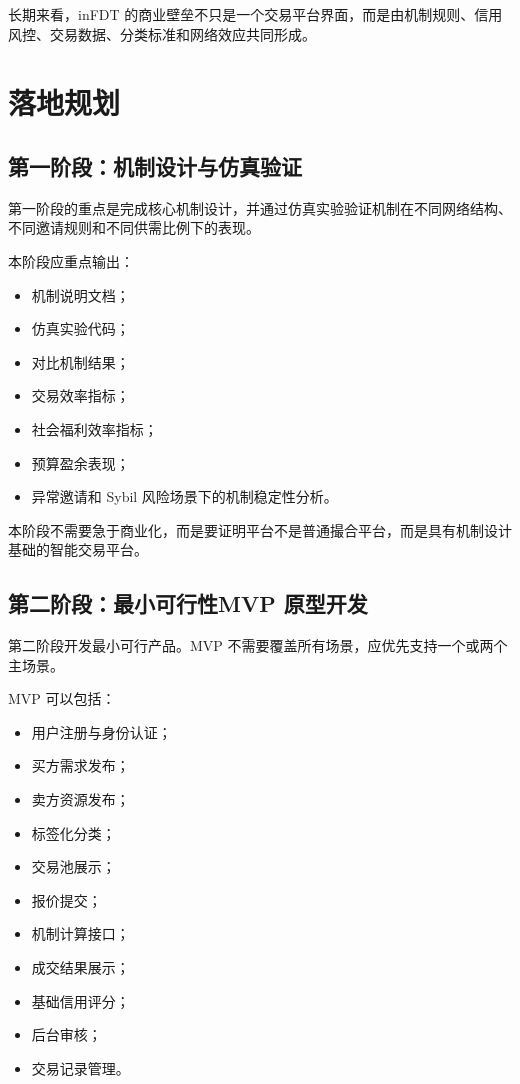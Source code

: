 \documentclass[UTF8,a4paper,12pt]{ctexart}
\begin{document}
长期来看，inFDT 的商业壁垒不只是一个交易平台界面，而是由机制规则、信用风控、交易数据、分类标准和网络效应共同形成。


\newpage
\section{落地规划}

\subsection{第一阶段：机制设计与仿真验证}

第一阶段的重点是完成核心机制设计，并通过仿真实验验证机制在不同网络结构、不同邀请规则和不同供需比例下的表现。

本阶段应重点输出：

\begin{itemize}
    \item 机制说明文档；
    \item 仿真实验代码；
    \item 对比机制结果；
    \item 交易效率指标；
    \item 社会福利效率指标；
    \item 预算盈余表现；
    \item 异常邀请和 Sybil 风险场景下的机制稳定性分析。
\end{itemize}

本阶段不需要急于商业化，而是要证明平台不是普通撮合平台，而是具有机制设计基础的智能交易平台。

\subsection{第二阶段：最小可行性MVP 原型开发}

第二阶段开发最小可行产品。MVP 不需要覆盖所有场景，应优先支持一个或两个主场景。

MVP 可以包括：

\begin{itemize}
    \item 用户注册与身份认证；
    \item 买方需求发布；
    \item 卖方资源发布；
    \item 标签化分类；
    \item 交易池展示；
    \item 报价提交；
    \item 机制计算接口；
    \item 成交结果展示；
    \item 基础信用评分；
    \item 后台审核；
    \item 交易记录管理。
\end{itemize}
\end{document}
